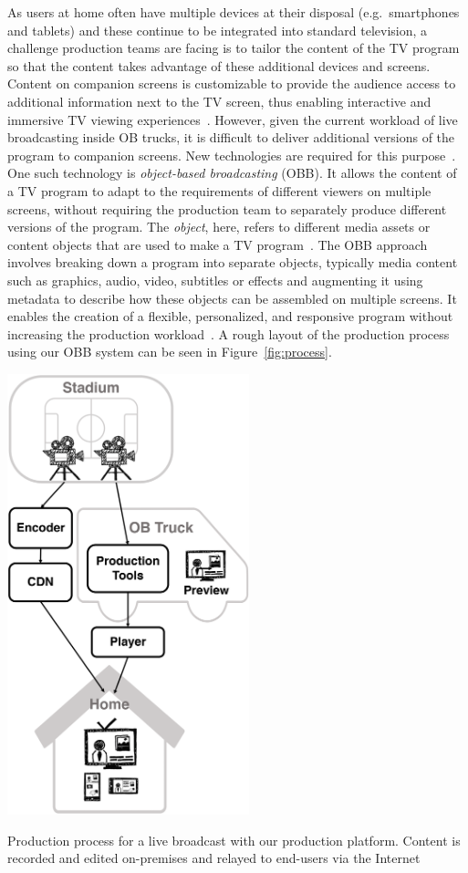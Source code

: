 \documentclass[sigchi-a, authorversion]{acmart}
\begin{document}
As users at home often have multiple devices at their disposal (e.g.\ smartphones
and tablets) and these continue to be integrated
into standard television, a challenge production teams are facing is to tailor
the content of the TV program so that the content takes advantage of these
additional devices and screens. Content on companion screens is
customizable to provide the audience access to additional information next to the TV
screen, thus enabling interactive and immersive TV viewing
experiences~\cite{bentley2017, dowell2015}. However, given the current workload
of live broadcasting inside OB trucks, it is difficult to deliver additional
versions of the program to companion screens. New technologies are required for
this purpose~\cite{Li:2018_TVX, armstrong2014}. One such technology is
\emph{object-based broadcasting} (OBB). It allows the content of a TV program to
adapt to the requirements of different viewers on multiple screens, without
requiring the production team to separately produce different versions
of the program. The \emph{object}, here, refers to different media assets or content
objects that are used to make a TV program~\cite{armstrong2014}. The OBB approach
involves breaking down a program into separate objects, typically
media content such as graphics, audio, video, subtitles or effects and augmenting
it using metadata to describe how these objects can be
assembled on multiple screens. It enables the creation of a flexible, personalized,
and responsive program without increasing the production
workload~\cite{kegel2017, armstrong2014}. A rough layout of the production process
using our OBB system can be seen in Figure~\ref{fig:process}.

\begin{marginfigure}
    \includegraphics[width=7cm]{Figures/process.png}
    \caption{Production process for a live broadcast with our production platform. Content is recorded and edited on-premises and relayed to end-users via the Internet}
    \label{fig:process}
\end{marginfigure}
\end{document}
